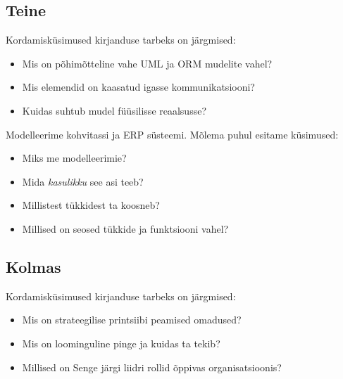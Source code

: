 \documentclass[nobib]{tufte-handout}
\begin{document}
\subsection{Teine}
Kordamisküsimused kirjanduse tarbeks on järgmised:
\begin{itemize}
	\item Mis on põhimõtteline vahe UML ja ORM mudelite vahel?
	\item Mis elemendid on kaasatud igasse kommunikatsiooni?
	\item Kuidas suhtub mudel füüsilisse reaalsusse?
\end{itemize}

Modelleerime kohvitassi ja ERP süsteemi. Mõlema puhul esitame küsimused:
\begin{itemize}
	\item Miks me modelleerimie?
	\item Mida \emph{kasulikku} see asi teeb?
	\item Millistest tükkidest ta koosneb?
	\item Millised on seosed tükkide ja funktsiooni vahel?
\end{itemize}

\subsection{Kolmas}
Kordamisküsimused kirjanduse tarbeks on järgmised:
\begin{itemize}
	\item Mis on strateegilise printsiibi peamised omadused?
	\item Mis on loominguline pinge ja kuidas ta tekib?
	\item Millised on Senge järgi liidri rollid õppivas organisatsioonis?
\end{itemize}
\end{document}
